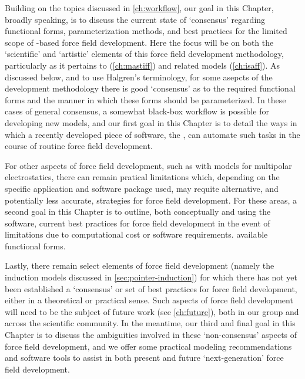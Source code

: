 Building on the topics discussed in \cref{ch:workflow}, our goal in 
this Chapter, broadly speaking, is to discuss the current state of `consensus'
regarding functional forms, parameterization methods, and best practices for
the limited scope of \sapt-based force field development.
Here the focus will be on both the `scientific' and `artistic' elements
of this force field development methodology, particularly as it pertains to 
\mastiff (\cref{ch:mastiff}) and related models (\cref{ch:isaff}). As discussed below, 
and to use Halgren's terminology, for some asepcts of the \mastiff
development methodology there is good `consensus' as to the required
functional forms and the manner in which these forms should be parameterized.
In these cases of general consensus, a somewhat black-box
workflow is possible for developing new \mastiff models, and our first goal in
this Chapter is to detail 
the ways in which a recently
developed piece of software, the \pointer, can automate such tasks in the
course of
routine force field development.

For other aspects of force field development, such as with models for
multipolar electrostatics, 
there can remain pratical limitations 
which,
depending on the specific application and software package used,
may requite alternative, and potentially less accurate, strategies
for force field development. For these areas, a second
goal in this Chapter is to outline, both conceptually and using the \pointer
software, current best practices for force field development in the event of
limitations due to computational cost or software requirements.
available functional forms.

Lastly, there remain select elements of force field development (namely the induction
models discussed in \cref{sec:pointer-induction}) for which there has not yet
been established a `consensus' or set of best practices for force field
development, either in a theoretical or practical sense. Such
aspects of force field development will need to be the subject of future work (see
\cref{ch:future}), both in our group and across the scientific community.
In the meantime, our third and
final goal in this Chapter is to discuss the ambiguities involved in these
`non-consensus' aspects of force field development, and we offer some
practical modeling recommendations and software tools to assist in both
present and future `next-generation' force field development.

